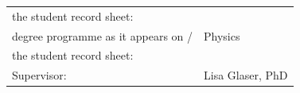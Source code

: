 \begin{titlepage}
\begin{center}
\begin{tabular}{p{9cm}p{11.25cm}}
        \fontsize{10}{0} \selectfont the student record sheet:\vspace*{0.4cm} &
        \fontsize{10}{0} \selectfont\\

        \fontsize{10}{0} \selectfont degree
        programme as it appears on / &  \fontsize{10}{0} \selectfont Physics \\

        \fontsize{10}{0} \selectfont the student record sheet:\vspace*{0.4cm} &
        \fontsize{10}{0} \selectfont \\

        \fontsize{10}{0} \selectfont
        Supervisor:\vspace*{0.4cm}& \fontsize{10}{0} \selectfont Lisa Glaser, PhD\\
\end{tabular}
\end{center}
\end{titlepage}
